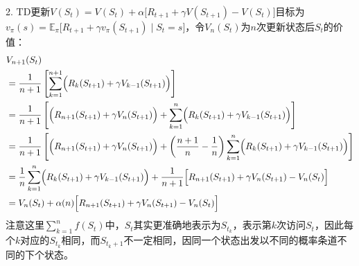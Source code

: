 \documentclass{ctexart}
\begin{document}
2. TD更新$V(S_t)=V(S_t)+\alpha\bigl[R_{t+1}+\gamma V(S_{t+1})-V(S_t)\bigr]​$目标为$v_\pi(s)=\mathbb E_\pi\bigl[R_{t+1}+\gamma v_\pi(S_{t+1})\mid S_t=s\bigr]​$，令$V_n(S_t)​$为$n​$次更新状态后$S_t​$的价值：
   \begin{align*}
   &V_{n+1}(S_{t})\\
   &= \frac1{n+1}\left[\sum_{k=1}^{n+1}\Bigl(R_{k}(S_{t+1})+\gamma V_{k-1}(S_{t+1})\Bigr)\right]\\
   &= \frac1{n+1}\left[\Bigl(R_{n+1}(S_{t+1})+\gamma V_n(S_{t+1})\Bigr) + \sum_{k=1}^n\Bigl(R_{k}(S_{t+1})+\gamma V_{k-1}(S_{t+1})\Bigr)\right]\\
   &= \frac1{n+1}\left[\Bigl(R_{n+1}(S_{t+1})+\gamma V_n(S_{t+1})\Bigr) + \left(\frac{n+1}{n}- \frac1n\right)\sum_{k=1}^n\Bigl(R_{k}(S_{t+1})+\gamma V_{k-1}(S_{t+1})\Bigr) \right]\\
   &= \frac1n\sum_{k=1}^n\Bigl(R_{k}(S_{t+1})+\gamma V_{k-1}(S_{t+1})\Bigr)+\frac1{n+1}\Bigl[R_{n+1}(S_{t+1})+\gamma V_n(S_{t+1})-V_n(S_t)\Bigr]\\
   &= V_n(S_t) + \alpha(n)\Bigl[R_{n+1}(S_{t+1})+\gamma V_n(S_{t+1})-V_n(S_t)\Bigr]
   \end{align*}
   注意这里$\sum_{k=1}^nf(S_t)$中，$S_t$其实更准确地表示为$S_{t_k}$，表示第$k$次访问$S_t$，因此每个$k$对应的$S_{t_k}$相同，而$S_{t_k+1}$不一定相同，因同一个状态出发以不同的概率条道不同的下个状态。

   ​
\end{document}
